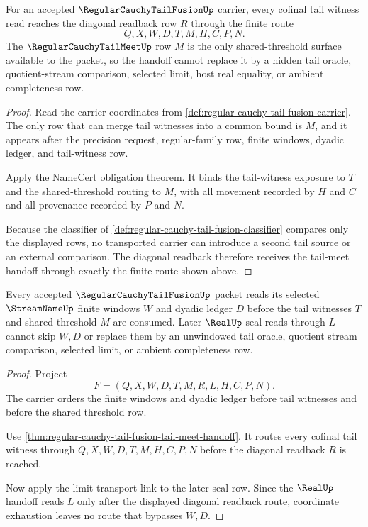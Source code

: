 \begin{theorem}
\label{thm:regular-cauchy-tail-fusion-tail-meet-handoff}
For an accepted $\RegularCauchyTailFusionUp$ carrier, every cofinal tail witness read reaches the diagonal readback row $R$ through the finite route
$$
Q,X,W,D,T,M,H,C,P,N.
$$
The $\RegularCauchyTailMeetUp$ row $M$ is the only shared-threshold surface available to the packet, so the handoff cannot replace it by a hidden tail oracle, quotient-stream comparison, selected limit, host real equality, or ambient completeness row.
\end{theorem}
\begin{proof}
Read the carrier coordinates from \autoref{def:regular-cauchy-tail-fusion-carrier}. The only row that can merge tail witnesses into a common bound is $M$, and it appears after the precision request, regular-family row, finite windows, dyadic ledger, and tail-witness row.

Apply the NameCert obligation theorem. It binds the tail-witness exposure to $T$ and the shared-threshold routing to $M$, with all movement recorded by $H$ and $C$ and all provenance recorded by $P$ and $N$.

Because the classifier of \autoref{def:regular-cauchy-tail-fusion-classifier} compares only the displayed rows, no transported carrier can introduce a second tail source or an external comparison. The diagonal readback therefore receives the tail-meet handoff through exactly the finite route shown above.
\end{proof}

\begin{theorem}
\label{thm:regular-cauchy-tail-fusion-window-monotone-handoff}
Every accepted $\RegularCauchyTailFusionUp$ packet reads its selected $\StreamNameUp$ finite windows $W$ and dyadic ledger $D$ before the tail witnesses $T$ and shared threshold $M$ are consumed. Later $\RealUp$ seal reads through $L$ cannot skip $W,D$ or replace them by an unwindowed tail oracle, quotient stream comparison, selected limit, or ambient completeness row.
\end{theorem}
\begin{proof}
Project
$$
F=(Q,X,W,D,T,M,R,L,H,C,P,N).
$$
The carrier orders the finite windows and dyadic ledger before tail witnesses and before the shared threshold row.

Use \autoref{thm:regular-cauchy-tail-fusion-tail-meet-handoff}. It routes every cofinal tail witness through $Q,X,W,D,T,M,H,C,P,N$ before the diagonal readback $R$ is reached.

Now apply the limit-transport link to the later seal row. Since the $\RealUp$ handoff reads $L$ only after the displayed diagonal readback route, coordinate exhaustion leaves no route that bypasses $W,D$.
\end{proof}


